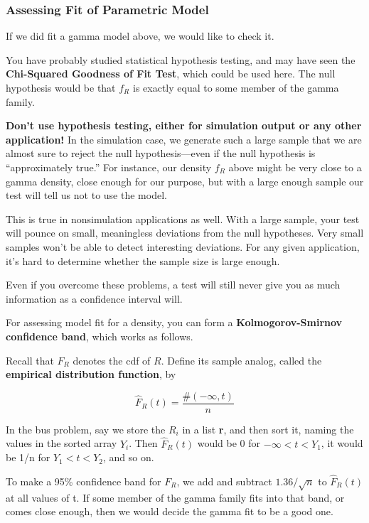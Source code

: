 \subsubsection{Assessing Fit of Parametric Model}

If we did fit a gamma model above, we would like to check it.

You have probably studied statistical hypothesis testing, and may have
seen the {\bf Chi-Squared Goodness of Fit Test}, which could be used
here.  The null hypothesis would be that $f_R$ is exactly equal to some
member of the gamma family.

{\bf Don't use hypothesis testing, either for simulation output or any
other application!}  In the simulation case, we generate such a large
sample that we are almost sure to reject the null hypothesis---even if 
the null hypothesis is ``approximately true.''  For instance, our
density $f_R$ above might be very close to a gamma density, close enough
for our purpose, but with a large enough sample our test will tell us
not to use the model.

This is true in nonsimulation applications as well.  With a large
sample, your test will pounce on small, meaningless deviations from the
null hypotheses.  Very small samples won't be able to detect interesting
deviations.  For any given application, it's hard to determine whether
the sample size is large enough.  

Even if you overcome these problems, a test will still never give you as
much information as a confidence interval will.

For assessing model fit for a density, you can form a {\bf
Kolmogorov-Smirnov confidence band}, which works as follows.

Recall that $F_R$ denotes the cdf of $R$.  Define its sample analog,
called the {\bf empirical distribution function}, by

\begin{equation}
\hat{F}_R(t) = \frac{\#(-\infty,t)}{n}
\end{equation}

In the bus problem, say we store the $R_i$ in a list {\bf r}, and then
sort it, naming the values in the sorted array $Y_i$.  Then
$\hat{F}_R(t)$ would be 0 for $-\infty < t < Y_1$, it would be 1/n for
$Y_1 < t < Y_2$, and so on.

To make a 95\% confidence band for $F_R$, we add and subtract
$1.36/\sqrt{n}$ to $\hat{F}_R(t)$ at all values of t.  If some member of
the gamma family fits into that band, or comes close enough, then we
would decide the gamma fit to be a good one.

